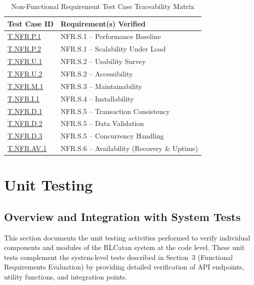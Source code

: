 \documentclass[12pt, titlepage]{article}
\begin{document}
\begin{table}[H]
  \centering
  \caption{Non-Functional Requirement Test Case Traceability Matrix}
  \label{tab:nfr-system-test-traceability}
  \begin{tabularx}{\textwidth}{|l|X|}
    \hline
    \textbf{Test Case ID} & \textbf{Requirement(s) Verified} \\ \hline
    \hyperlink{T.NFR.P.1}{T.NFR.P.1}   & NFR.S.1 -- Performance Baseline \\ \hline
    \hyperlink{T.NFR.P.2}{T.NFR.P.2}   & NFR.S.1 -- Scalability Under Load \\ \hline %
    \hyperlink{T.NFR.U.1}{T.NFR.U.1}   & NFR.S.2 -- Usability Survey \\ \hline
    \hyperlink{T.NFR.U.2}{T.NFR.U.2}   & NFR.S.2 -- Accessibility \\ \hline
    \hyperlink{T.NFR.M.1}{T.NFR.M.1}   & NFR.S.3 -- Maintainability \\ \hline
    \hyperlink{T.NFR.I.1}{T.NFR.I.1}   & NFR.S.4 -- Installability \\ \hline
    \hyperlink{T.NFR.D.1}{T.NFR.D.1}   & NFR.S.5 -- Transaction Consistency \\ \hline
    \hyperlink{T.NFR.D.2}{T.NFR.D.2}   & NFR.S.5 -- Data Validation \\ \hline
    \hyperlink{T.NFR.D.3}{T.NFR.D.3}   & NFR.S.5 -- Concurrency Handling \\ \hline
    \hyperlink{T.NFR.AV.1}{T.NFR.AV.1}  & NFR.S.6 -- Availability (Recovery \& Uptime) \\ \hline
  \end{tabularx}
\end{table}

\section{Unit Testing}

\subsection{Overview and Integration with System Tests}

This section documents the unit testing activities performed to verify individual components and modules of the RLCatan system at the code level. These unit tests complement the system-level tests described in Section~3 (Functional Requirements Evaluation) by providing detailed verification of API endpoints, utility functions, and integration points.
\end{document}
